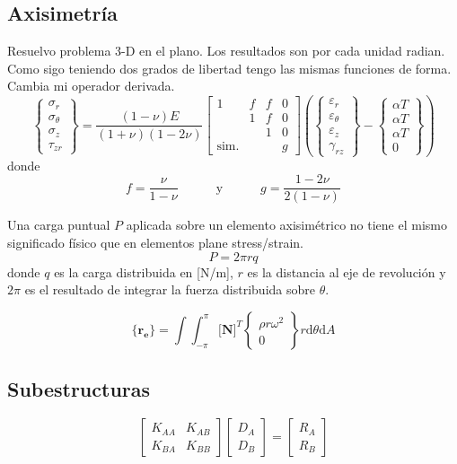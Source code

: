 \documentclass[draft,11pt, a4paper,titlepage]{article}
\newcommand{\unspace}{\!\!\!\!\!\!\!\!\!\!\!\!\!\!\!\!\!\!\!\!}
\newcommand{\di}{\textrm{d}}
\newcommand{\Mme}[1]{\boldsymbol{[}\mathbf{#1} \boldsymbol{]}}
\newcommand{\Cme}[1]{\boldsymbol{\{ }\mathbf{#1} \boldsymbol{\}} }
\newcommand{\MN}{\Mme{N}}
\newcommand{\radial}{r}
\newcommand{\eff}{f}
\begin{document}
\subsection{Axisimetría}
Resuelvo problema 3-D en el plano. Los resultados son por cada unidad radian. Como sigo teniendo dos grados de libertad tengo las mismas funciones de forma. Cambia mi operador derivada.
\[
\begin{Bmatrix}
    \sigma_\radial \\
    \sigma_\theta \\
    \sigma_z \\
    \tau_{z\radial}
\end{Bmatrix}
= \frac{(1-\nu)E}{(1+\nu)(1-2\nu)}
\begin{bmatrix}
   1 & \eff & \eff & 0 \\
    & 1 & \eff & 0 \\
    & & 1 & 0 \\
    \textrm{sim.}\unspace& & & g 
\end{bmatrix}
\left(
\begin{Bmatrix}
\varepsilon_\radial \\
\varepsilon_\theta \\
\varepsilon_z \\
\gamma_{\radial z}
\end{Bmatrix}
-
\begin{Bmatrix}
\alpha T\\
\alpha T \\
\alpha T \\
0
\end{Bmatrix}
\right)
\]
donde 
\[
f=\frac{\nu}{1-\nu}\qquad \quad \textrm{y}\quad \qquad g=\frac{1-2\nu}{2(1-\nu)}
\]

Una carga puntual $P$ aplicada sobre un elemento axisimétrico no tiene el mismo significado físico que en elementos plane stress/strain. 
\[
P=2\pi rq
\]
donde $q$ es la carga distribuida en [N/m], $r$ es la distancia al eje de revolución y $2 \pi$ es el resultado de integrar la fuerza distribuida sobre $\theta$. 

\[
\Cme{r_e} = \int\int_{-\pi}^{\pi} \MN^T \begin{Bmatrix}
    \rho r \omega ^2 \\
    0
\end{Bmatrix} r \di \theta \di A
\]

\subsection{Subestructuras}
\[
\begin{bmatrix}
    K_{AA} & K_{AB} \\
    K_{BA} & K_{BB}
\end{bmatrix}
\begin{bmatrix}
    D_A \\
    D_B
\end{bmatrix}
= \begin{bmatrix}
    R_A \\
    R_B
\end{bmatrix}
\]
\end{document}

